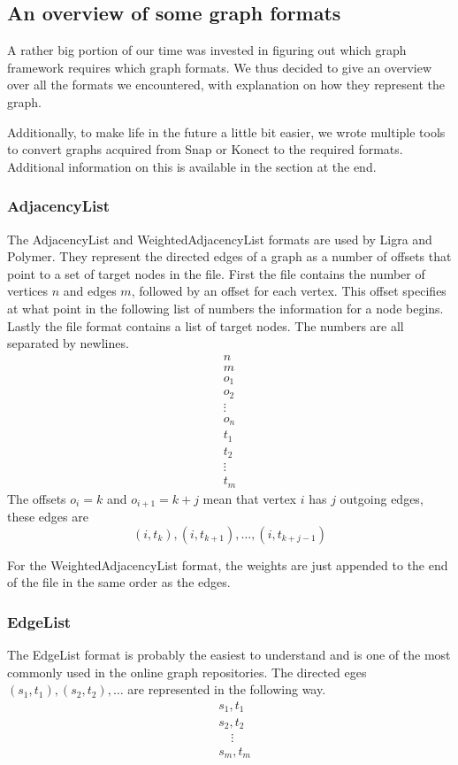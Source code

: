 
\subsection{An overview of some graph formats}
A rather big portion of our time was invested in figuring out which graph framework requires which graph formats. We thus decided to give an overview over all the formats we encountered, with explanation on how they represent the graph.

Additionally, to make life in the future a little bit easier, we wrote multiple tools to convert graphs acquired from Snap or Konect to the required formats. Additional information on this is available in the section  at the end.

\subsubsection{AdjacencyList}
The AdjacencyList and WeightedAdjacencyList formats\cite{adjListFormat} are used by Ligra and Polymer. They represent the directed edges of a graph as a number of offsets that point to a set of target nodes in the file.
First the file contains the number of vertices $n$ and edges $m$, followed by an offset for each vertex. This offset specifies at what point in the following list of numbers the information for a node begins.
Lastly the file format contains a list of target nodes.
The numbers are all separated by newlines.
\begin{gather*}
n\\
m\\
o_1\\
o_2\\
\vdots\\
o_n\\
t_1\\
t_2\\
\vdots\\
t_m
\end{gather*}
The offsets $o_i=k$ and $o_{i+1}=k+j$ mean that vertex $i$ has $j$ outgoing edges, these edges are
\begin{equation*}
	(i,t_k),(i,t_{k+1}),\ldots,(i,t_{k+j-1})
\end{equation*}

For the WeightedAdjacencyList format, the weights are just appended to the end of the file in the same order as the edges.

\subsubsection{EdgeList}
The EdgeList format is probably the easiest to understand and is one of the most commonly used in the online graph repositories. The directed eges $(s_1,t_1),(s_2,t_2),\ldots$ are represented in the following way.
\begin{align*}
	&s_1,t_1\\
	&s_2,t_2\\
	&\quad\vdots\\
	&s_m,t_m
\end{align*}

